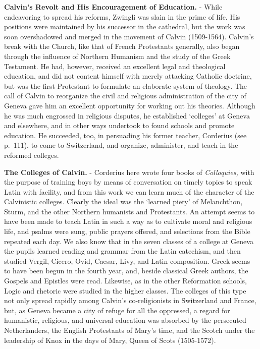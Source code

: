 \documentclass[]{book}
\begin{document}
\textbf{Calvin's Revolt and His Encouragement of Education.} - While endeavoring to spread his reforms, Zwingli was slain in the prime of life. His positions were maintained by his successor in the cathedral, but the work was soon overshadowed and merged in the movement of Calvin (1509-1564). Calvin's break with the Church, like that of French Protestants generally, also began through the influence of Northern Humanism and the study of the Greek Testament. He had, however, received an excellent legal and theological education, and did not content himself with merely attacking Catholic doctrine, but was the first Protestant to formulate an elaborate system of theology. The call of Calvin to reorganize the civil and religious administration of the city of Geneva gave him an excellent opportunity for working out his theories. Although he was much engrossed in religious disputes, he established `colleges' at Geneva and elsewhere, and in other ways undertook to found schools and promote education. He succeeded, too, in persuading his former teacher, Corderius (see p.~111), to come to Switzerland, and organize, administer, and teach in the reformed colleges.

\textbf{The Colleges of Calvin.} - Corderius here wrote four books of \emph{Colloquies,} with the purpose of training boys by means of conversation on timely topics to speak Latin with facility, and from this work we can learn much of the character of the Calvinistic colleges. Clearly the ideal was the `learned piety' of Melanchthon, Sturm, and the other Northern humanists and Protestants. An attempt seems to have been made to teach Latin in such a way as to cultivate moral and religious life, and psalms were sung, public prayers offered, and selections from the Bible repeated each day. We also know that in the seven classes of a college at Geneva the pupils learned reading and grammar from the Latin catechism, and then studied Vergil, Cicero, Ovid, Caesar, Livy, and Latin composition. Greek seems to have been begun in the fourth year, and, beside classical Greek authors, the Gospels and Epistles were read. Likewise, as in the other Reformation schools, Logic and rhetoric were studied in the higher classes. The colleges of this type not only spread rapidly among Calvin's co-religionists in Switzerland and France, but, as Geneva became a city of refuge for all the oppressed, a regard for humanistic, religious, and universal education was absorbed by the persecuted Netherlanders, the English Protestants of Mary's time, and the Scotch under the leadership of Knox in the days of Mary, Queen of Scots (1505-1572).
\end{document}
